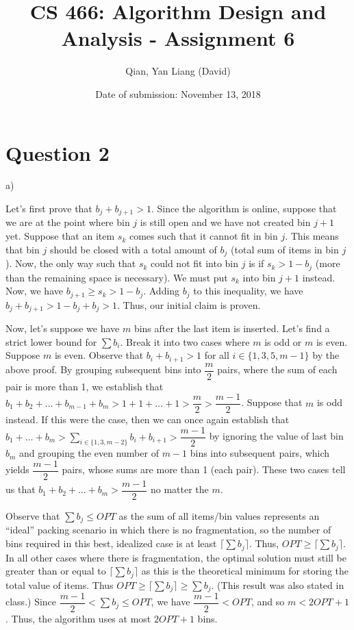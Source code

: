 \documentclass{article}
\title{CS 466: Algorithm Design and Analysis - Assignment 6}
\author{Qian, Yan Liang (David)}
\date{Date of submission: November 13, 2018}
\begin{document}
\newpage

\section{Question 2}

a)

Let's first prove that $b_j + b_{j+1} > 1$. Since the algorithm is online, suppose that we are at the point where bin
$j$ is still open and we have not created bin $j + 1$ yet. Suppose that an item $s_k$ comes such that it cannot fit in bin
$j$. This means that bin $j$ should be closed with a total amount of $b_j$ (total sum of items in bin $j$). Now, the
only way such that $s_k$ could not fit into bin $j$ is if $s_k > 1 - b_j$ (more than the remaining space is necessary).
We must put $s_k$ into bin $j + 1$ instead. Now, we have $b_{j + 1} \geq s_k > 1 - b_j$. Adding $b_j$ to this
inequality, we have $b_j + b_{j + 1} > 1 - b_j + b_j > 1$. Thus, our initial claim is proven.

Now, let's suppose we have $m$ bins after the last item is inserted. Let's find a strict lower bound for $\sum b_i$.
Break it into two cases where $m$ is odd or $m$ is even.  Suppose $m$ is even. Observe that $b_i + b_{i + 1} > 1$ for
all $i \in \{1, 3, 5, m-1\}$ by the above proof. By grouping subsequent bins into $\dfrac{m}{2}$ pairs, where the sum of
each pair is more than 1, we establish that $b_1 + b_2 + \ldots + b_{m-1} + b_{m} > 1 + 1 + \ldots + 1 > \dfrac{m}{2} >
\dfrac{m-1}{2}$. Suppose that $m$ is odd instead. If this were the case, then we can once again establish that $b_1 +
\ldots + b_m > \sum_{i \in \{1, 3, m-2\}} b_i + b_{i + 1} > \dfrac{m-1}{2}$ by ignoring the value of last bin $b_{m}$
and grouping the even number of $m-1$ bins into subsequent pairs, which yields $\dfrac{m-1}{2}$ pairs, whose sums are
more than 1 (each pair). These two cases tell us that $b_1 + b_2 + \ldots + b_m > \dfrac{m-1}{2}$ no matter the $m$.

Observe that $\sum b_j \leq OPT$ as the sum of all items/bin values represents an ``ideal'' packing scenario in which
there is no fragmentation, so the number of bins required in this best, idealized case is at least $\lceil \sum b_j
\rceil$. Thus, $OPT \geq \lceil \sum b_j \rceil$. In all other cases where there is fragmentation, the optimal solution
must still be greater than or equal to $\lceil \sum b_j \rceil$ as this is the theoretical minimum for storing the total
value of items. Thus $OPT \geq \lceil \sum b_j \rceil \geq \sum b_j$. (This result was also stated in class.) Since
$\dfrac{m-1}{2} < \sum b_j \leq OPT$, we have $\dfrac{m-1}{2} < OPT$, and so $m < 2OPT + 1$. Thus, the algorithm uses at
most $2OPT + 1$ bins.
\end{document}
